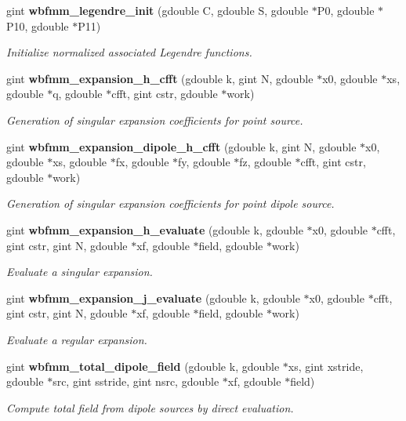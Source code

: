 \begin{DoxyCompactItemize}
gint {\bf wbfmm\+\_\+legendre\+\_\+init} (gdouble C, gdouble S, gdouble $\ast$P0, gdouble $\ast$P10, gdouble $\ast$P11)
\begin{DoxyCompactList}\small\item\em Initialize normalized associated Legendre functions. \end{DoxyCompactList}\item 
gint {\bf wbfmm\+\_\+expansion\+\_\+h\+\_\+cfft} (gdouble k, gint N, gdouble $\ast$x0, gdouble $\ast$xs, gdouble $\ast$q, gdouble $\ast$cfft, gint cstr, gdouble $\ast$work)
\begin{DoxyCompactList}\small\item\em Generation of singular expansion coefficients for point source. \end{DoxyCompactList}\item 
gint {\bf wbfmm\+\_\+expansion\+\_\+dipole\+\_\+h\+\_\+cfft} (gdouble k, gint N, gdouble $\ast$x0, gdouble $\ast$xs, gdouble $\ast$fx, gdouble $\ast$fy, gdouble $\ast$fz, gdouble $\ast$cfft, gint cstr, gdouble $\ast$work)
\begin{DoxyCompactList}\small\item\em Generation of singular expansion coefficients for point dipole source. \end{DoxyCompactList}\item 
gint {\bf wbfmm\+\_\+expansion\+\_\+h\+\_\+evaluate} (gdouble k, gdouble $\ast$x0, gdouble $\ast$cfft, gint cstr, gint N, gdouble $\ast$xf, gdouble $\ast$field, gdouble $\ast$work)
\begin{DoxyCompactList}\small\item\em Evaluate a singular expansion. \end{DoxyCompactList}\item 
gint {\bf wbfmm\+\_\+expansion\+\_\+j\+\_\+evaluate} (gdouble k, gdouble $\ast$x0, gdouble $\ast$cfft, gint cstr, gint N, gdouble $\ast$xf, gdouble $\ast$field, gdouble $\ast$work)
\begin{DoxyCompactList}\small\item\em Evaluate a regular expansion. \end{DoxyCompactList}\item 
gint {\bf wbfmm\+\_\+total\+\_\+dipole\+\_\+field} (gdouble k, gdouble $\ast$xs, gint xstride, gdouble $\ast$src, gint sstride, gint nsrc, gdouble $\ast$xf, gdouble $\ast$field)
\begin{DoxyCompactList}\small\item\em Compute total field from dipole sources by direct evaluation. \end{DoxyCompactList}\item 

\end{DoxyCompactItemize}
